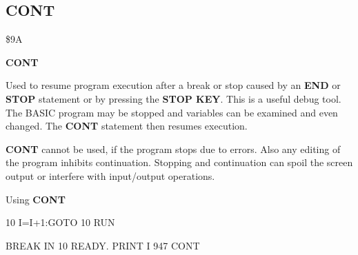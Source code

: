 \subsection{CONT}
\begin{description}[leftmargin=3cm,style=nextline]
\item [Token:] \$9A
\item [Format:] {\bf CONT}
\item [Usage:] Used to resume
               program execution after a break or stop caused by
               an {\bf END} or {\bf STOP} statement or by pressing
               the {\bf STOP KEY}.
               This is a useful debug tool. The BASIC program may be stopped
               and variables can be examined and even changed.
               The {\bf CONT} statement then resumes execution.
\item [Remarks:] {\bf CONT} cannot be used, if the program stops
               due to errors. Also any editing of the program
               inhibits continuation. Stopping and continuation
               can spoil the screen output or interfere with
               input/output operations.
\item [Example:] Using {\bf CONT}
\begin{screenoutput}
10 I=I+1:GOTO 10
RUN

BREAK IN 10
READY.
PRINT I
 947
CONT
\end{screenoutput}
\end{description}


\newpage
